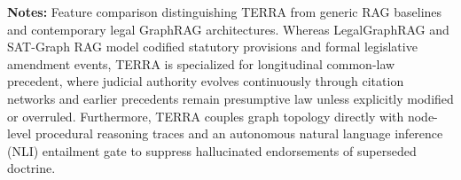 \begin{table}[!t]
{\begin{tabular}{p{2.5cm}p{3.5cm}p{3.8cm}p{3.8cm}p{3.8cm}p{3.2cm}}
\bottomrule
\end{tabular}%
}
\vspace{1mm}
\raggedright \footnotesize \textbf{Notes:} Feature comparison distinguishing TERRA from generic RAG baselines and contemporary legal GraphRAG architectures. Whereas LegalGraphRAG \cite{chen2026legalgraphrag} and SAT-Graph RAG \cite{demartim2025satgraphrag} model codified statutory provisions and formal legislative amendment events, TERRA is specialized for longitudinal common-law precedent, where judicial authority evolves continuously through citation networks and earlier precedents remain presumptive law unless explicitly modified or overruled. Furthermore, TERRA couples graph topology directly with node-level procedural reasoning traces and an autonomous natural language inference (NLI) entailment gate to suppress hallucinated endorsements of superseded doctrine.
\end{table}

